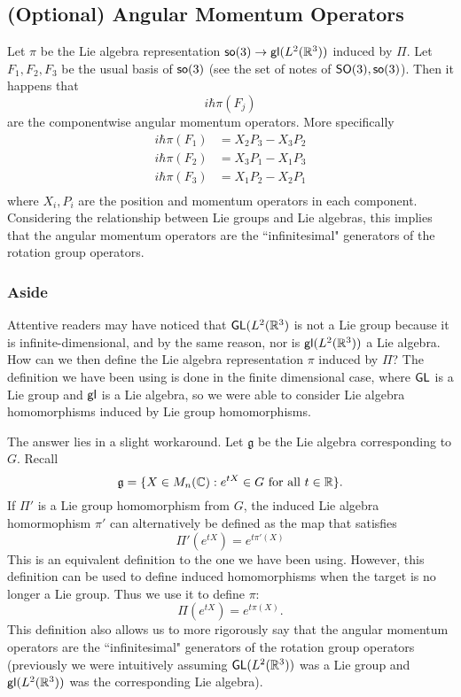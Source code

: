 \subsection{(Optional) Angular Momentum Operators}
Let $\pi$ be the Lie algebra representation $\operatorname{\textsf{so}}(3) \rightarrow \operatorname{\textsf{gl}}(L^2({\mathbb R}^3))$ induced by $\Pi$. Let $F_1, F_2, F_3$ be the usual basis of $\operatorname{\textsf{so}}(3)$ (see the set of notes of $\operatorname{\textsf{SO}}(3), \operatorname{\textsf{so}}(3)$). Then it happens that
\[
    i\hbar\pi(F_j)
\]
are the componentwise angular momentum operators. More specifically
\[
    \begin{split}
        i\hbar\pi(F_1) &= X_2P_3 - X_3P_2\\
        i\hbar\pi(F_2) &= X_3P_1 - X_1P_3\\
        i\hbar\pi(F_3) &= X_1P_2 - X_2P_1\\
    \end{split}
\]
where $X_i, P_i$ are the position and momentum operators in each component. Considering the relationship between Lie groups and Lie algebras, this implies that the angular momentum operators are the ``infinitesimal" generators of the rotation group operators.

\subsubsection{Aside}
Attentive readers may have noticed that $\operatorname{\textsf{GL}}(L^2({\mathbb R}^3)$ is not a Lie group because it is infinite-dimensional, and by the same reason, nor is $\operatorname{\textsf{gl}}(L^2({\mathbb R}^3))$ a Lie algebra. How can we then define the Lie algebra representation $\pi$ induced by $\Pi$? The definition we have been using is done in the finite dimensional case, where $\operatorname{\textsf{GL}}$ is a Lie group and $\operatorname{\textsf{gl}}$ is a Lie algebra, so we were able to consider Lie algebra homomorphisms induced by Lie group homomorphisms.

The answer lies in a slight workaround. Let $\mathfrak g$ be the Lie algebra corresponding to $G$. Recall
\[
    \mathfrak g = \{X \in M_n({\mathbb C}) : e^{tX} \in G \text{ for all } t \in {\mathbb R}\}.
\]
If $\Pi'$ is a Lie group homomorphism from $G$, the induced Lie algebra homormophism $\pi'$ can alternatively be defined as the map that satisfies
\[
    \Pi'(e^{tX}) = e^{t\pi'(X)}
\]
This is an equivalent definition to the one we have been using. However, this definition can be used to define induced homomorphisms when the target is no longer a Lie group. Thus we use it to define $\pi$:
\[
    \Pi(e^{tX}) = e^{t\pi(X)}.
\]
This definition also allows us to more rigorously say that the angular momentum operators are the ``infinitesimal" generators of the rotation group operators (previously we were intuitively assuming $\operatorname{\textsf{GL}}(L^2({\mathbb R}^3))$ was a Lie group and $\operatorname{\textsf{gl}}(L^2({\mathbb R}^3))$ was the corresponding Lie algebra).
